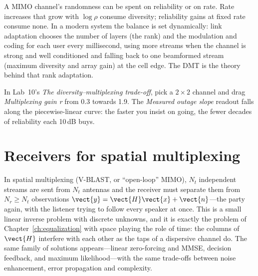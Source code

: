 \begin{keyidea}
A MIMO channel's randomness can be spent on reliability or on rate. Rate increases that grow with
$\log\rho$ consume diversity; reliability gains at fixed rate consume none. In a modern system
the balance is set dynamically: link adaptation chooses the number of layers (the rank) and the
modulation and coding for each user every millisecond, using more streams when the channel is
strong and well conditioned and falling back to one beamformed stream (maximum diversity and array
gain) at the cell edge. The DMT is the theory behind that rank adaptation.
\end{keyidea}


\begin{tryit}
In Lab~10's \emph{The diversity--multiplexing trade-off}, pick a $2\times2$ channel and drag
\emph{Multiplexing gain r} from 0.3 towards 1.9. The \emph{Measured outage slope} readout falls
along the piecewise-linear curve: the faster you insist on going, the fewer decades of reliability
each 10\,dB buys.
\end{tryit}

\section{Receivers for spatial multiplexing}
\label{sec:ch19:detection}

In spatial multiplexing (V-BLAST, or ``open-loop'' MIMO), $N_t$ independent streams are sent from
$N_t$ antennas and the receiver must separate them from $N_r\ge N_t$ observations
$\vect{y}=\vect{H}\vect{x}+\vect{n}$---the party again, with the listener trying to follow every
speaker at once. This is a small linear inverse problem with discrete unknowns, and it is exactly
the problem of Chapter~\ref{ch:equalization} with space playing the role of time: the columns of
$\vect{H}$ interfere with each other as the taps of a dispersive channel do. The same family of
solutions appears---linear zero-forcing and MMSE, decision feedback, and maximum
likelihood---with the same trade-offs between noise enhancement, error propagation and
complexity.

